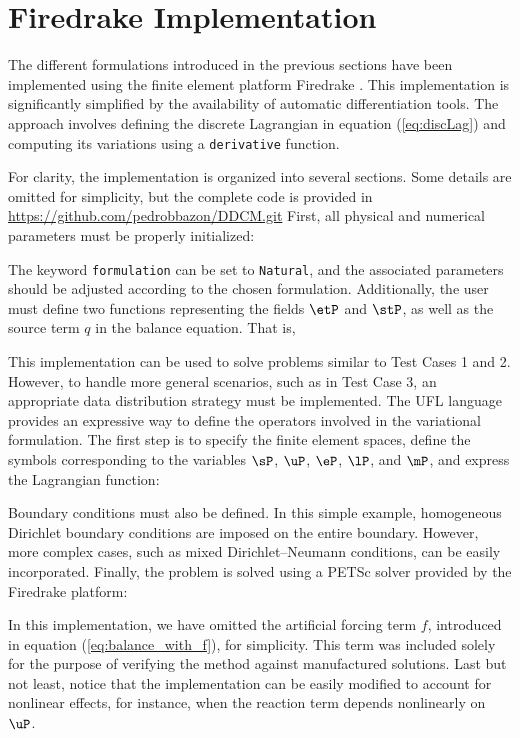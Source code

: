 \appendix
	
	\section{Firedrake Implementation}
	
	The different formulations introduced in the previous sections have 
	been implemented using the finite element platform Firedrake \cite{FiredrakeUserManual}. 
	This implementation is significantly simplified by the availability of automatic differentiation tools. The approach involves defining the discrete Lagrangian in 
	equation (\ref{eq:discLag}) and computing its variations using a \texttt{derivative} 
	function.

	For clarity, the implementation is organized into several sections. 
	Some details are omitted for simplicity, but the complete code 
	is provided in \url{https://github.com/pedrobbazon/DDCM.git}
	First, all physical and numerical parameters must be properly initialized:
	
	The keyword \texttt{formulation} can be set to 
	\texttt{\textquotesingle Natural\textquotesingle}, 
	and the associated parameters should be adjusted according 
	to the chosen formulation.
	Additionally, the user must define two functions representing 
	the fields $\etP$ and $\stP$, as well as the source term $q$ 
	in the balance equation. That is,
		
	This implementation can be used to solve problems similar to Test Cases 1 and 2. 
	However, to handle more general scenarios, such as in Test Case 3,
	an appropriate data distribution strategy must be implemented.
	The UFL language \cite{Alnaes2014} provides an expressive way to 
	define the operators involved in the variational formulation. 
	The first step is to specify the finite element spaces, define the 
	symbols corresponding to the variables $\sP$, $\uP$, $\eP$, $\lP$, and $\mP$, 
	and express the Lagrangian function:
	
	Boundary conditions must also be defined. In this simple example, 
	homogeneous Dirichlet boundary conditions are imposed on the entire 
	boundary. However, more complex cases, such as mixed Dirichlet–Neumann 
	conditions, can be easily incorporated.
	Finally, the problem is solved using a PETSc solver provided by 
	the Firedrake platform:
	
	In this implementation, we have omitted the artificial forcing term $f$, introduced in equation (\ref{eq:balance_with_f}), for simplicity. This term was included solely for 
	the purpose of verifying the method against manufactured solutions. Last but not least, notice that the implementation can be easily modified to account for nonlinear effects, 
	for instance, when the reaction term depends nonlinearly on $\uP$.
	
